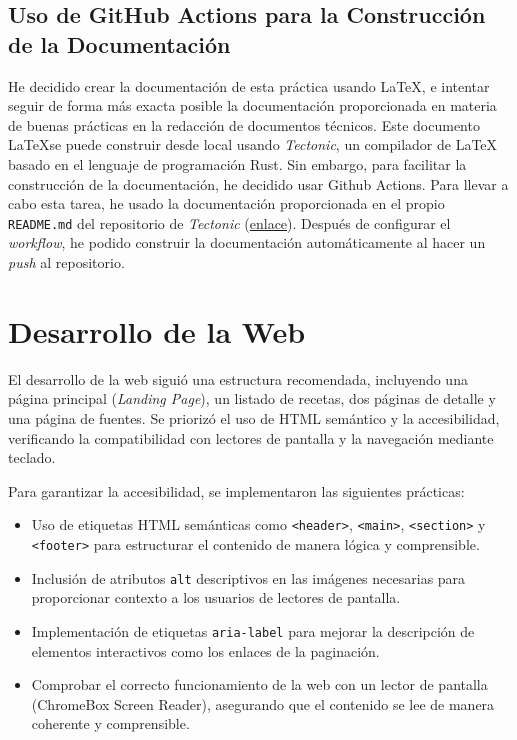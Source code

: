 \documentclass{article}
\begin{document}
\subsection{Uso de GitHub Actions para la Construcción de la Documentación}\label{subsec:uso-de-github-actions-para-la-construccion-de-la-documentacion}

He decidido crear la documentación de esta práctica usando \LaTeX, e intentar seguir de forma más exacta posible la documentación proporcionada en materia de buenas prácticas en la redacción de documentos técnicos. Este documento \LaTeX se puede construir desde local usando \textit{Tectonic}, un compilador de LaTeX basado en el lenguaje de programación Rust. Sin embargo, para facilitar la construcción de la documentación, he decidido usar Github Actions. Para llevar a cabo esta tarea, he usado la documentación proporcionada en el propio \texttt{README.md} del repositorio de \textit{Tectonic} (\href{https://github.com/marketplace/actions/setup-tectonic}{enlace}). Después de configurar el \textit{workflow}, he podido construir la documentación automáticamente al hacer un \textit{push} al repositorio.

\section{Desarrollo de la Web}\label{sec:desarrollo-de-la-web}

El desarrollo de la web siguió una estructura recomendada, incluyendo una página principal (\textit{Landing Page}), un listado de recetas, dos páginas de detalle y una página de fuentes. Se priorizó el uso de HTML semántico y la accesibilidad, verificando la compatibilidad con lectores de pantalla y la navegación mediante teclado.

Para garantizar la accesibilidad, se implementaron las siguientes prácticas:

\begin{itemize}
    \item Uso de etiquetas HTML semánticas como \texttt{<header>}, \texttt{<main>}, \texttt{<section>} y \texttt{<footer>} para estructurar el contenido de manera lógica y comprensible.
    \item Inclusión de atributos \texttt{alt} descriptivos en las imágenes necesarias para proporcionar contexto a los usuarios de lectores de pantalla.
    \item Implementación de etiquetas \texttt{aria-label} para mejorar la descripción de elementos interactivos como los enlaces de la paginación.
    \item Comprobar el correcto funcionamiento de la web con un lector de pantalla (ChromeBox Screen Reader), asegurando que el contenido se lee de manera coherente y comprensible.
\end{itemize}
\end{document}
